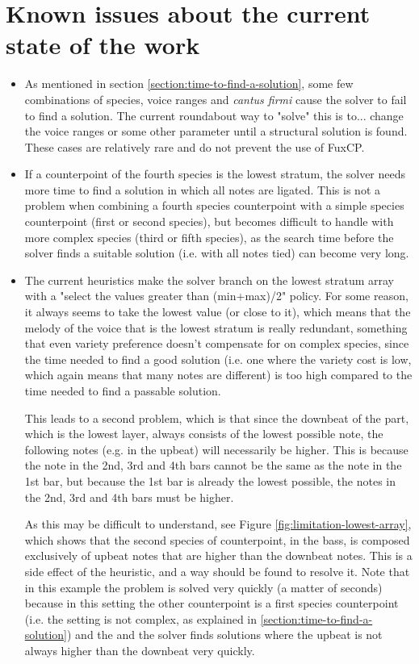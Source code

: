 \section{Known issues about the current state of the work} \label{section:known-issues-about-the-current-state-of-the-work}
\begin{itemize}
  \item As mentioned in section \ref{section:time-to-find-a-solution}, some few combinations of species, voice ranges and \textit{cantus firmi} cause the solver to fail to find a solution. The current roundabout way to "solve" this is to... change the voice ranges or some other parameter until a structural solution is found. These cases are relatively rare and do not prevent the use of FuxCP.
  \item If a counterpoint of the fourth species is the lowest stratum, the solver needs more time to find a solution in which all notes are ligated. This is not a problem when combining a fourth species counterpoint with a simple species counterpoint (first or second species), but becomes difficult to handle with more complex species (third or fifth species), as the search time before the solver finds a suitable solution (i.e. with all notes tied) can become very long.
  \item The current heuristics make the solver branch on the lowest stratum array with a "select the values greater than (min+max)/2" policy. For some reason, it always seems to take the lowest value (or close to it), which means that the melody of the voice that is the lowest stratum is really redundant, something that even variety preference doesn't compensate for on complex species, since the time needed to find a good solution (i.e. one where the variety cost is low, which again means that many notes are different) is too high compared to the time needed to find a passable solution.
  
  This leads to a second problem, which is that since the downbeat of the part, which is the lowest layer, always consists of the lowest possible note, the following notes (e.g. in the upbeat) will necessarily be higher. This is because the note in the 2nd, 3rd and 4th bars cannot be the same as the note in the 1st bar, but because the 1st bar is already the lowest possible, the notes in the 2nd, 3rd and 4th bars must be higher. 
  
  As this may be difficult to understand, see Figure \ref{fig:limitation-lowest-array}, which shows that the second species of counterpoint, in the bass, is composed exclusively of upbeat notes that are higher than the downbeat notes. This is a side effect of the heuristic, and a way should be found to resolve it. Note that in this example the problem is solved very quickly (a matter of seconds) because in this setting the other counterpoint is a first species counterpoint (i.e. the setting is not complex, as explained in \ref{section:time-to-find-a-solution}) and the and the solver finds solutions where the upbeat is not always higher than the downbeat very quickly.
\end{itemize}
